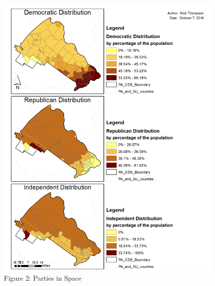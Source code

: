 \documentclass[]{article}
\begin{document}
\begin{figure}[htbp]
\centering
\includegraphics{question_2.png}
\caption{Figure 2: Parties in Space}
\end{figure}
\end{document}
